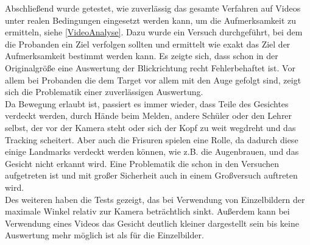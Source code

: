 Abschließend wurde getestet, wie zuverlässig das gesamte Verfahren auf Videos unter realen Bedingungen eingesetzt werden kann, um die Aufmerksamkeit zu ermitteln, siehe \autoref{VideoAnalyse}. Dazu wurde ein Versuch durchgeführt, bei dem die Probanden ein Ziel verfolgen sollten und ermittelt wie exakt das Ziel der Aufmerksamkeit bestimmt werden kann. Es zeigte sich, dass schon in der Originalgröße eine Auswertung der Blickrichtung recht Fehlerbehaftet ist. Vor allem bei Probanden die dem Target vor allem mit den Auge gefolgt sind, zeigt sich die Problematik einer zuverlässigen Auswertung.\\
Da Bewegung erlaubt ist, passiert es immer wieder, dass Teile des Gesichtes verdeckt werden, durch Hände beim Melden, andere Schüler oder den Lehrer selbst, der vor der Kamera steht oder sich der Kopf zu weit wegdreht und das Tracking scheitert. Aber auch die Frisuren spielen eine Rolle, da dadurch diese einige Landmarks verdeckt werden können, wie z.B. die Augenbrauen, und das Gesicht nicht erkannt wird. Eine Problematik die schon in den Versuchen aufgetreten ist und mit großer Sicherheit auch in einem Großversuch auftreten wird.\\
Des weiteren haben die Tests gezeigt, das bei Verwendung von Einzelbildern der maximale Winkel relativ zur Kamera beträchtlich sinkt. Außerdem kann bei Verwendung eines Videos das Gesicht deutlich kleiner dargestellt sein bis keine Auswertung mehr möglich ist als für die Einzelbilder.

